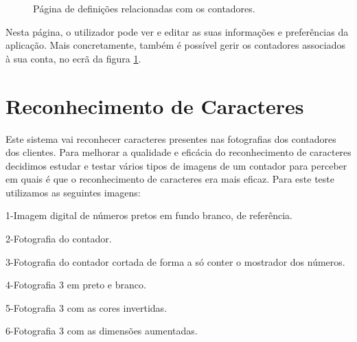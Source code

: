 \begin{figure}
\begin{minipage}{.5\textwidth}
\caption{Página de definições relacionadas com os contadores.}
\label{fig:5}
\end{minipage}
\end{figure}

Nesta página, o utilizador pode ver e editar as suas informações e preferências da aplicação. Mais concretamente, também é possível gerir os contadores associados à sua conta, no ecrã da figura \ref{fig:5}.

\section{Reconhecimento de Caracteres} \label{sec:dados}
Este sistema vai reconhecer caracteres presentes nas fotografias dos contadores dos clientes. Para melhorar a qualidade e eficácia do reconhecimento de caracteres decidimos estudar e testar vários tipos de imagens de um contador para perceber em quais é que o reconhecimento de caracteres era mais eficaz.
Para este teste utilizamos as seguintes imagens:\\
\par1-Imagem digital de números pretos em fundo branco, de referência.
\par2-Fotografia do contador.
\par3-Fotografia do contador cortada de forma a só conter o mostrador dos números.
\par4-Fotografia 3 em preto e branco.
\par5-Fotografia 3 com as cores invertidas.
\par6-Fotografia 3 com as dimensões aumentadas.\\

